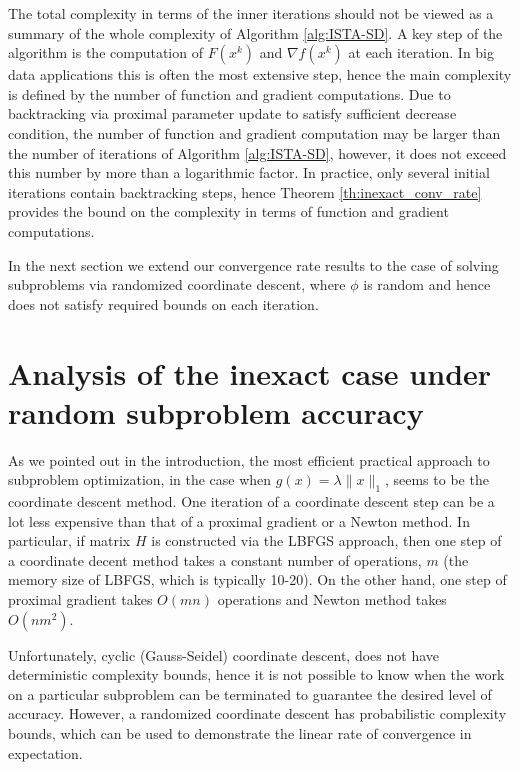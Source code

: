 \documentclass[11pt]{article}
\numberwithin{equation}{section}
\begin{document}
\begin{remark} The total complexity in terms of the inner iterations should not be viewed as  a summary of the whole complexity of Algorithm \ref{alg:ISTA-SD}.
A key step of the algorithm is the computation of $F(x^{k})$ and $\nabla f(x^k)$ at each iteration. In  big data applications this is often the 
most extensive step, hence the main complexity is defined by the number of function and gradient computations. 
Due to backtracking via proximal parameter update to satisfy sufficient decrease condition, 
the number of function and gradient  computation may be larger than the number of iterations of 
Algorithm \ref{alg:ISTA-SD}, however,
 it does not exceed this number  by more than a logarithmic factor. In practice, only several initial iterations contain backtracking steps, hence 
 Theorem  \ref{th:inexact_conv_rate} provides the bound  on the complexity in terms of function and gradient computations. 
\end{remark}

In the next section we extend our convergence rate results to the case of solving subproblems via randomized coordinate descent,  where
 $\phi$ is random and hence does not satisfy required bounds on each iteration. 

\section{Analysis of the inexact case under random subproblem accuracy}\label{sec:random}
As we pointed out in the introduction, the most efficient  practical approach to subproblem optimization, in the case when  $g(x)=\lambda \|x\|_1$, seems to be the coordinate descent method. One iteration of a coordinate descent step can be a lot less expensive 
than that of a proximal gradient or a Newton method. In particular, if matrix $H$ is constructed via the 
LBFGS approach, then one step of a coordinate decent
method takes a constant number 
of operations, $m$ (the memory size of LBFGS, which is typically 10-20). 
On the other hand, one step of proximal gradient takes $O(mn)$ operations and Newton method takes $O(nm^2)$. 

Unfortunately,  cyclic (Gauss-Seidel) coordinate descent, does not have deterministic complexity bounds, hence it is not possible to know when the work on a particular subproblem can be terminated to guarantee the desired  level of accuracy. However, a randomized coordinate descent has probabilistic complexity bounds, which can be used to demonstrate the linear rate of convergence in expectation.
\end{document}

